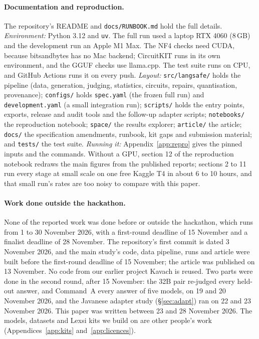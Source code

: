 \documentclass[11pt]{article}
\begin{document}
\paragraph{Documentation and reproduction.} The repository's README and \texttt{docs/RUNBOOK.md} hold the full
details. \emph{Environment:} Python 3.12 and \texttt{uv}. The full run used a laptop RTX 4060 (8\,GB) and the
development run an Apple M1 Max. The NF4 checks need CUDA, because bitsandbytes has no Mac backend; CircuitKIT runs in
its own environment, and the GGUF checks use llama.cpp. The test suite runs on CPU, and GitHub Actions runs it on
every push. \emph{Layout:} \texttt{src/langsafe/} holds the pipeline (data, generation, judging, statistics, circuits,
repairs, quantisation, provenance); \texttt{configs/} holds \texttt{spec.yaml} (the frozen full run) and
\texttt{development.yaml} (a small integration run); \texttt{scripts/} holds the entry points, exports, release and
audit tools and the follow-up adapter scripts; \texttt{notebooks/} the reproduction notebook; \texttt{space/} the
results explorer; \texttt{article/} the article; \texttt{docs/} the specification amendments, runbook, kit gaps and
submission material; and \texttt{tests/} the test suite. \emph{Running it:} Appendix~\ref{app:repro} gives the
pinned inputs and the commands. Without a GPU, section 12 of the reproduction notebook redraws the main figures from
the published reports; sections 2 to 11 run every stage at small scale on one free Kaggle T4 in about 6 to 10 hours,
and that small run's rates are too noisy to compare with this paper.

\paragraph{Work done outside the hackathon.} None of the reported work was done before or outside the hackathon,
which runs from 1 to 30 November 2026, with a first-round deadline of 15 November and a finalist deadline of
28 November. The repository's first commit is dated 3 November 2026, and the main study's
code, data pipeline, runs and article were built before the first-round deadline of 15 November; the article was
published on 13 November. No code from our earlier project Kavach is reused. Two parts were done in the second round, after 15 November: the 32B pair
re-judged every held-out answer, and Command~A every answer of five models, on 19 and 20 November 2026, and the
Javanese adapter study (\S\ref{sec:adapt}) ran on 22 and 23 November 2026. This paper was written between 23 and
28 November 2026. The models, datasets and Lexsi kits we build on are other people's work (Appendices~\ref{app:kits}
and~\ref{app:licences}).
\end{document}

